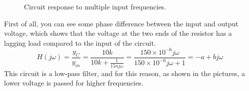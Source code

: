 \documentclass[11pt]{article}
\begin{document}
\begin{question}
\begin{subquestion}
{\begin{figure}[H]
                \caption{Circuit response to multiple input frequencies.}
            \end{figure}
            First of all, you can see some phase difference between the input and output voltage, which shows that the voltage at the two ends of the resistor has a lagging load compared to the input of the circuit.
            \[
                H(j\omega) = \frac{y_C}{y_{in}} = \frac{10k}{10k + \frac{1}{15n j\omega}} = \frac{150 \times 10^{-6} j\omega}{150 \times 10^{-6} j\omega + 1} = -a + bj\omega
            \]
            This circuit is a low-pass filter, and for this reason, as shown in the pictures, a lower voltage is passed for higher frequencies.
        }
    \end{subquestion}


\end{question}

\end{document}
